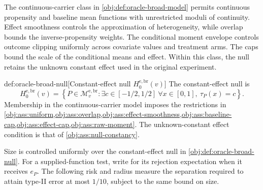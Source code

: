 The continuous-carrier class  in \cref{obj:def:oracle-broad-model} permits continuous propensity and baseline mean functions with unrestricted moduli of continuity. Effect smoothness controls the approximation of heterogeneity, while overlap bounds the inverse-propensity weights. The conditional moment envelope controls outcome clipping uniformly across covariate values and treatment arms. The caps bound the scale of the conditional means and effect. Within this class, the null retains the unknown constant effect used in the original experiment.

\begin{definitionv}{def:oracle-broad-null}[Constant-effect null \(H_0^{\mathrm{e,br}}(v)\)]
The constant-effect null is
\[
 H_0^{\mathrm{e,br}}(v)=
 \left\{P\in\mathcal M_v^{\mathrm{e,br}}:
 \exists c\in[-1/2,1/2]\ \forall x\in[0,1],\
 \tau_P(x)=c\right\}.
\]
Membership in the continuous-carrier model imposes the restrictions in
\cref{obj:ass:uniform,obj:ass:overlap,obj:ass:effect-smoothness,obj:ass:baseline-cap,obj:ass:effect-cap,obj:ass:raw-moment}.
The unknown-constant effect condition is that of \cref{obj:ass:null-constancy}.
\end{definitionv}

Size is controlled uniformly over the constant-effect null  in \cref{obj:def:oracle-broad-null}. For a supplied-function test, write  for its rejection expectation when it receives \(e_P\). The following risk and radius measure the separation required to attain type-II error at most \(1/10\), subject to the same bound on size.

